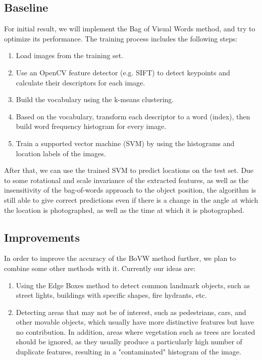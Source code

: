 \documentclass{article}
\begin{document}
\subsection{Baseline}

For initial result, we will implement the Bag of Visual Words method, and try to optimize its performance. The training process includes the following steps:

\begin{enumerate}
    \item Load images from the training set.
    \item Use an OpenCV feature detector (e.g. SIFT) to detect keypoints and calculate their descriptors for each image.
    \item Build the vocabulary using the k-means clustering.
    \item Based on the vocabulary, transform each descriptor to a word (index), then build word frequency histogram for every image.
    \item Train a supported vector machine (SVM) by using the histograms and location labels of the images.
\end{enumerate}

After that, we can use the trained SVM to predict locations on the test set. Due to some rotational and scale invariance of the extracted features, as well as the insensitivity of the bag-of-words approach to the object position, the algorithm is still able to give correct predictions even if there is a change in the angle at which the location is photographed, as well as the time at which it is photographed.

\subsection{Improvements}

In order to improve the accuracy of the BoVW method further, we plan to combine some other methods with it. Currently our ideas are:

\begin{enumerate}
    \item Using the Edge Boxes method to detect common landmark objects, such as street lights, buildings with specific shapes, fire hydrants, etc.
    \item Detecting areas that may not be of interest, such as pedestrians, cars, and other movable objects, which usually have more distinctive features but have no contribution. In addition, areas where vegetation such as trees are located should be ignored, as they usually produce a particularly high number of duplicate features, resulting in a "contaminated" histogram of the image.
\end{enumerate}
\end{document}
